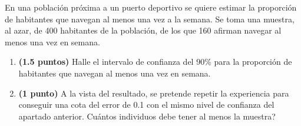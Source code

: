 
En una población próxima a un puerto deportivo se quiere estimar la proporción de habitantes que navegan al menos una vez a la semana. Se toma una muestra, al azar, de 400 habitantes de la población, de los que 160 afirman navegar al menos una vez en semana.
\begin{enumerate}[label=\alph*)]
\item \textbf{(1.5 puntos)} Halle el intervalo de confianza del 90\% para la proporción de habitantes que navegan al menos una vez en semana.
\item \textbf{(1 punto)} A la vista del resultado, se pretende repetir la experiencia para conseguir una cota del error de 0.1 con el mismo nivel de confianza del apartado anterior. \textquestiondown{}Cuántos individuos debe tener al menos la muestra?
\end{enumerate}
